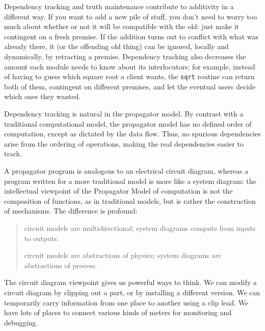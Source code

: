 \documentclass[12pt,letterpaper,english]{article}
\begin{document}
Dependency tracking and truth maintenance contribute to additivity in
a different way.  If you want to add a new pile of stuff, you don't
need to worry too much about whether or not it will be compatible with
the old: just make it contingent on a fresh premise.  If the addition
turns out to conflict with what was already there, it (or the
offending old thing) can be ignored, locally and dynamically, by
retracting a premise.  Dependency tracking also decreases the amount
each module needs to know about its interlocutors; for example,
instead of having to guess which square root a client wants, the
\texttt{sqrt} routine can return both of them, contingent on different
premises, and let the eventual users decide which ones they wanted.

Dependency tracking is natural in the propagator model.  By contrast
with a traditional computational model, the propagator model has no
defined order of computation, except as dictated by the data flow.
Thus, no spurious dependencies arise from the ordering of operations,
making the real dependencies easier to track.

A propagator program is analogous to an electrical circuit diagram,
whereas a program written for a more traditional model is more like a
system diagram: the intellectual viewpoint of the Propagator Model of
computation is not the composition of functions, as in traditional
models, but is rather the construction of mechanisms.  The difference
is profound:
\begin{quote}
\begin{list}{.}
{
\setlength{\rightmargin}{\leftmargin}
}
\item {} 
circuit models are multidirectional; system diagrams compute
from inputs to outputs.

\item {} 
circuit models are abstractions of physics; system diagrams
are abstractions of process.

\end{list}
\end{quote}

The circuit diagram viewpoint gives us powerful ways to think.  We can
modify a circuit diagram by clipping out a part, or by installing a
different version.  We can temporarily carry information from one
place to another using a clip lead.  We have lots of places to connect
various kinds of meters for monitoring and debugging.
\end{document}
